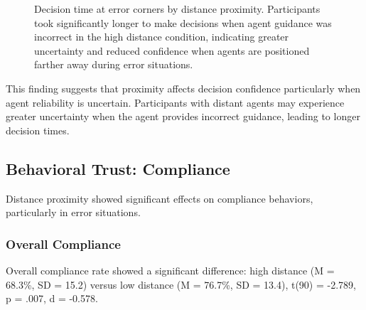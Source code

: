 \documentclass[12pt]{article}
\begin{document}
\begin{figure}[h]
\centering
{}
\caption{Decision time at error corners by distance proximity. Participants took significantly longer to make decisions when agent guidance was incorrect in the high distance condition, indicating greater uncertainty and reduced confidence when agents are positioned farther away during error situations.}
\label{fig:error_corner_decision_time}
\end{figure}

This finding suggests that proximity affects decision confidence particularly when agent reliability is uncertain. Participants with distant agents may experience greater uncertainty when the agent provides incorrect guidance, leading to longer decision times.


\subsection{Behavioral Trust: Compliance}

Distance proximity showed significant effects on compliance behaviors, particularly in error situations.

\subsubsection{Overall Compliance}

Overall compliance rate showed a significant difference: high distance (M = 68.3\%, SD = 15.2) versus low distance (M = 76.7\%, SD = 13.4), t(90) = -2.789, p = .007, d = -0.578.
\end{document}
